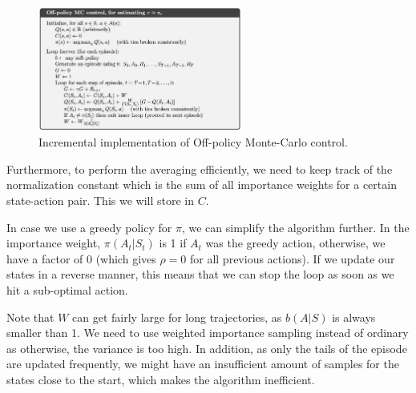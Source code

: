 \begin{itemize}
	\begin{figure}[ht!]
		\centering
		\includegraphics[width=0.6\textwidth]{figures/rl_tabular_methods_offpolicy_MC_control.png}
		\caption{Incremental implementation of Off-policy Monte-Carlo control.}
		\label{fig:rl_tabular_methods_offpolicy_MC_control}
	\end{figure}
	
	Furthermore, to perform the averaging efficiently, we need to keep track of the normalization constant which is the sum of all importance weights for a certain state-action pair. This we will store in $C$. 
	
	In case we use a greedy policy for $\pi$, we can simplify the algorithm further. In the importance weight, $\pi(A_t|S_t)$ is 1 if $A_t$ was the greedy action, otherwise, we have a factor of 0 (which gives $\rho=0$ for all previous actions). If we update our states in a reverse manner, this means that we can stop the loop as soon as we hit a sub-optimal action. 
	
	Note that $W$ can get fairly large for long trajectories, as $b(A|S)$ is always smaller than 1. We need to use weighted importance sampling instead of ordinary as otherwise, the variance is too high. In addition, as only the tails of the episode are updated frequently, we might have an insufficient amount of samples for the states close to the start, which makes the algorithm inefficient.
	
	
\end{itemize}
